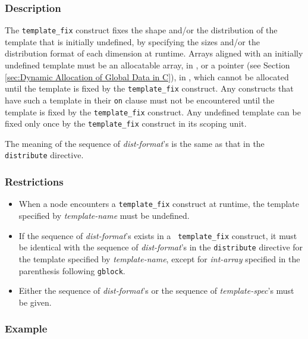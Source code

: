 \subsubsection*{Description}

The {\tt template\_fix} construct fixes the shape and/or the
distribution of the template that is initially undefined, by specifying
the sizes and/or the distribution format of 
each dimension at runtime. Arrays aligned with an initially undefined
template must be an allocatable array, in {\XMPF}, or a pointer (see
Section \ref{sec:Dynamic Allocation of Global Data in C}), in
{\XMPC}, which cannot be allocated until the template is fixed by the
{\tt template\_fix} construct. Any constructs that have such a
template in their {\tt on} clause must not be encountered until the
template is fixed by the {\tt template\_fix} construct. Any undefined
template can be fixed only once by the {\tt template\_fix} construct in
its scoping unit.

The meaning of the sequence of {\it dist-format}'s is the same
as that in the {\tt distribute} directive.

\subsubsection*{Restrictions}

\begin{itemize}
\item When a node encounters a {\tt template\_fix} construct at runtime,
      the template specified by {\it template-name} must be undefined.
\item If the sequence of {\it dist-format}'s exists in a {\tt
      template\_fix} construct, it must be identical with the 
      sequence of {\it dist-format}'s in the {\tt distribute} directive
      for the template specified by {\it template-name}, except for {\it
      int-array} specified in the parenthesis following {\tt gblock}.
\item Either the sequence of {\it dist-format}'s or the sequence of {\it
      template-spec}'s must be given. 
\end{itemize}

\subsubsection*{Example}

